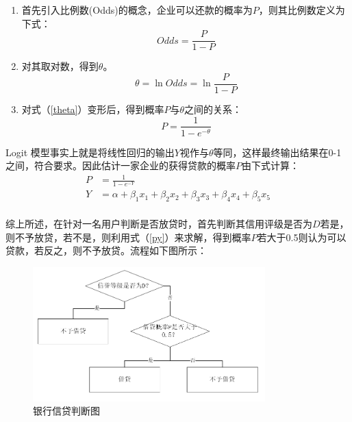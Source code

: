\documentclass{my_paper}
\begin{document}
\begin{enumerate}
    \item 首先引入比例数(Odds)的概念，企业可以还款的概率为$P$，则其比例数定义为下式：
    \begin{equation}
    Odds = \frac{P}{1-P}
    \label{odd}
    \end{equation}
    \item 对其取对数，得到$\theta$。
    \begin{equation}
        \theta = \ln Odds = \ln \frac{P}{1-P}
        \label{theta}
    \end{equation}
    \item 对式（\ref{theta}）变形后，得到概率$P$与$\theta$之间的关系：
    \begin{equation}
        P = \frac{1}{1-\mathit{e}^{-\theta}}
    \end{equation}
\end{enumerate}
Logit 模型事实上就是将线性回归的输出$Y$视作与$\theta$等同，这样最终输出结果在0-1之间，符合要求。因此估计一家企业的获得贷款的概率$P$由下式计算：
\begin{equation}
    \begin{aligned}
        P &= \frac{1}{1-\mathit{e}^{-Y}}\\
        Y &= \alpha + \beta_1x_1 +\beta_2x_2 +\beta_3x_3 +\beta_4x_4 +\beta_5x_5 \\
    \end{aligned}
\label{py}
\end{equation}

综上所述，在针对一名用户判断是否放贷时，首先判断其信用评级是否为$D$若是，则不予放贷，若不是，则利用式（\ref{py}）来求解，得到概率$P$若大于0.5则认为可以贷款，若反之，则不予放贷。流程如下图所示：
\begin {figure}[h]
\centering %
\includegraphics[width=0.8\textwidth]{511.png}
\caption{银行信贷判断图} %
\label{five}
\end {figure}
\newpage
\end{document}
